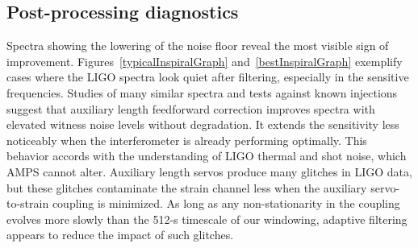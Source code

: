         \subsection{Post-processing diagnostics}
        \label{diagnostics}
 

Spectra showing the lowering of the noise floor reveal the most visible sign of improvement. Figures~\ref{typicalInspiralGraph} and~\ref{bestInspiralGraph} exemplify cases where the LIGO spectra look quiet after filtering, especially in the sensitive frequencies. Studies of many similar spectra and tests against known injections suggest that auxiliary length feedforward correction improves spectra with elevated witness noise levels without degradation. It extends the sensitivity less noticeably when the interferometer is already performing optimally. This behavior accords with the understanding of LIGO thermal and shot noise, which AMPS cannot alter. Auxiliary length servos produce many glitches in LIGO data, but these glitches contaminate the strain channel less when the auxiliary servo-to-strain coupling is minimized. As long as any non-stationarity in the coupling evolves more slowly than the 512-s timescale of our windowing, adaptive filtering appears to reduce the impact of such glitches.

